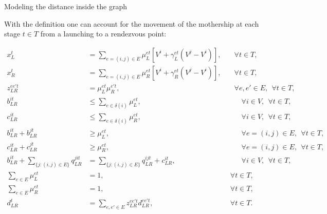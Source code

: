 \documentclass[slidestop,usepdftitle=false,10pt]{beamer}
\begin{document}
	\begin{frame}{Modeling the distance inside the graph}
	\begin{small}
	With the definition one can account for the movement of the mothership at each stage $t\in T$ from a launching to a rendezvous point:\end{small}
	\begin{tiny}
	{\color{red}
    \begin{align}
        x_L^t & = \sum_{e=(i, j)\in E} \mu_{L}^{et}\left[V^i + \gamma_{L}^{et}(V^j - V^i)\right], & \quad \forall t \in T,\label{st:param1bis}\\
        x_R^t & = \sum_{e=(i, j)\in E} \mu_{R}^{et}\left[ V^i + \gamma_{R}^{et}(V^j - V^i)\right],  & \quad \forall t \in T, \label{st:param2bis}\\
      z_{LR}^{ee't} & = \mu_{L}^{et}\mu_{R}^{e't},  & \quad \forall e,e' \in E, \:\:  \forall t \in T, \label{st:prodLRbis}\\
        b_{LR}^{it} & \leq \sum_{e\in\delta(i)}\mu_{L}^{et}, \label{st:bLt1}&\qquad\forall i\in V, \:\: \forall t \in T, \\
        c_{LR}^{it} & \leq \sum_{e\in\delta(i)}\mu_{R}^{et}, \label{st:cLt1}&\qquad\forall i\in V, \:\: \forall t \in T, \\
        b_{LR}^{it} + b_{LR}^{jt} & \geq \mu_L^{et}, &\qquad \forall e=(i, j)\in E, \:\: \forall t \in T, \label{st:bLt2}\\
        c_{LR}^{it} + c_{LR}^{jt} & \geq \mu_R^{et}, &\qquad \forall e=(i, j)\in E, \:\: \forall t \in T, \label{st:cLt2}\\
        b_{LR}^{it} + \sum_{\{j:(i, j)\in E\}} q_{LR}^{jit} & = \sum_{\{j:(i, j)\in E\}} q_{LR}^{ijt} +  c_{LR}^{it}, \label{st:flow}&\qquad \forall i \in V, \:\: \forall t \in T, \\
        \sum_{e\in E} \mu_{L}^{et} & = 1, & \:\: \forall t \in T, \label{st:muLe} \\
        \sum_{e\in E} \mu_{R}^{et} & = 1, &\:\: \forall t \in T, \label{st:muRe}\\
        d_{LR}^t & = \sum_{e, e'\in E} z_{LR}^{ee't} d_{LR}^{ee't}, &\:\: \forall t \in T.  \label{st:dLRt}
    \end{align}}
    \end{tiny}
    \end{frame}
    
\end{document}

